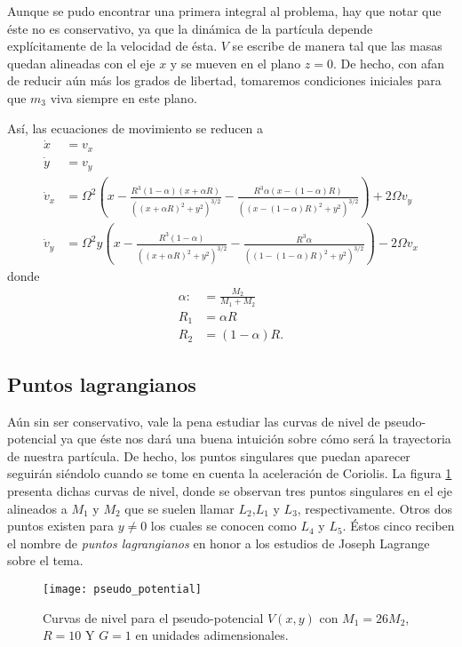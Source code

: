 Aunque se pudo encontrar una primera integral al problema, hay que notar que éste no es conservativo, ya que la dinámica de la partícula depende explícitamente de la velocidad de ésta. $V$ se escribe de manera tal que las masas quedan alineadas con el eje $x$ y se mueven en el plano $z = 0$. De hecho, con afan de reducir aún más los grados de libertad, tomaremos condiciones iniciales para que $m_3$ viva siempre en este plano.

Así, las ecuaciones de movimiento se reducen a
\begin{align}
 \dot{x} &= v_x \\
 \dot{y} &= v_y \\
 \dot{v}_x &= \Omega^2 \left( x - \frac{ R^3 (1 - \alpha) (x+\alpha R) }{\left( (x+\alpha R)^2 + y^2 \right)^{3/2} } - \frac{ R^3 \alpha (x- (1 -\alpha) R) }{\left( (x - (1-\alpha) R)^2 + y^2 \right)^{3/2} } \right) + 2\Omega v_y \\ 
 \dot{v}_y &= \Omega^2 y \left( x - \frac{ R^3 (1 - \alpha) }{\left( (x+\alpha R)^2 + y^2 \right)^{3/2} } - \frac{ R^3 \alpha }{\left( (1 - (1-\alpha) R)^2 + y^2 \right)^{3/2} } \right) - 2\Omega v_x
\end{align}
donde
\begin{align*}
 \alpha :&= \frac{M_2}{M_1 + M_2} \\ 
 R_1 &= \alpha R \\
 R_2 &= (1 - \alpha) R.
\end{align*}

\subsection{Puntos lagrangianos}
\label{sec:lag_points}

Aún sin ser conservativo, vale la pena estudiar las curvas de nivel de pseudo-potencial ya que éste nos dará una buena intuición sobre cómo será la trayectoria de nuestra partícula. De hecho, los puntos singulares que puedan aparecer seguirán siéndolo cuando se tome en cuenta la aceleración de Coriolis. La figura \ref{fig:3body_pseudo_potential} presenta dichas curvas de nivel, donde se observan tres puntos singulares en el eje alineados a $M_1$ y $M_2$ que se suelen llamar $L_2$,$L_1$ y $L_3$, respectivamente. Otros dos puntos existen para $y \neq 0$ los cuales se conocen como $L_4$ y $L_5$. Éstos cinco reciben el nombre de \textit{puntos lagrangianos} en honor a los estudios de Joseph Lagrange sobre el tema.

\begin{figure}[h!]
 \centering
 \texttt{[image: pseudo\_potential]}
 \caption{Curvas de nivel para el pseudo-potencial $V(x,y)$ con $M_1 = 26M_2$, $R = 10$ Y $G=1$ en unidades adimensionales.}
 \label{fig:3body_pseudo_potential}
\end{figure}


